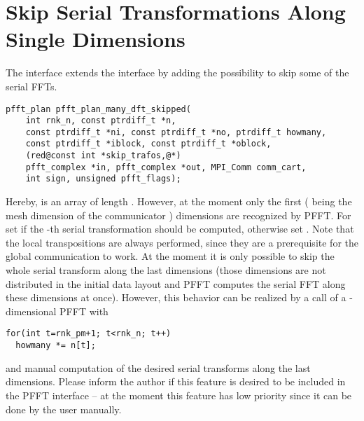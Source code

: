 \section{Skip Serial Transformations Along Single Dimensions}\label{sec:skip-trafo}
The  interface extends the  interface by adding the possibility to skip some of the serial FFTs.
\begin{lstlisting}
pfft_plan pfft_plan_many_dft_skipped(
    int rnk_n, const ptrdiff_t *n,
    const ptrdiff_t *ni, const ptrdiff_t *no, ptrdiff_t howmany,
    const ptrdiff_t *iblock, const ptrdiff_t *oblock,
    (red@const int *skip_trafos,@*)
    pfft_complex *in, pfft_complex *out, MPI_Comm comm_cart,
    int sign, unsigned pfft_flags);
\end{lstlisting}
Hereby,  is an  array of length . However, at the moment only the first 
 ( being the mesh dimension of the communicator ) dimensions are recognized by PFFT.
For  set  if the -th serial transformation should be computed, otherwise set .
Note that the local transpositions are always performed, since they are a prerequisite for the global communication to work.
At the moment it is only possible to skip the whole serial transform along the last  dimensions (those dimensions are not distributed in the initial data layout and PFFT computes the serial FFT along these dimensions at once).
However, this behavior can be realized by a call of a -dimensional PFFT with
\begin{lstlisting}
for(int t=rnk_pm+1; t<rnk_n; t++)
  howmany *= n[t];
\end{lstlisting}
and manual computation of the desired serial transforms along the last  dimensions.
Please inform the author if this feature is desired to be included in the PFFT interface -- at the moment this feature has low priority since it can be done by the user manually.
